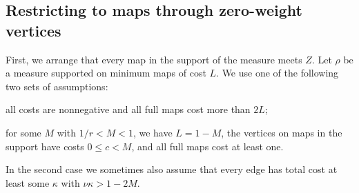 \subsection{Restricting to maps through zero-weight vertices}
First, we arrange that every map in the support of the measure meets $Z$. Let $\rho$ be a measure supported on minimum maps of cost $L$. We use one of the following two sets of assumptions:
\begin{props}
\item\label{norm391:cutoff:1} all costs are nonnegative and all full maps cost more than $2L$;
\item\label{norm391:cutoff:2} for some $M$ with $1/r<M<1$, we have $L=1-M$, the vertices on maps in the support have costs $0\le c<M$, and all full maps cost at least one.
\end{props}
In the second case we sometimes also assume that every edge has total cost at least some $\kappa$ with
$\nu\kappa>1-2M$.

